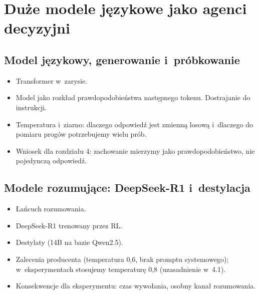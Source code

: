 
\chapter{Duże modele językowe jako agenci decyzyjni}
\label{ch:llm-agenci}


\section{Model językowy, generowanie i~próbkowanie}
\label{sec:2-1}

\begin{planroboczy}[ok. 2 s.]
\begin{itemize}
  \item Transformer w~zarysie.
  \item Model jako rozkład prawdopodobieństwa następnego tokenu. Dostrajanie do instrukcji.
  \item Temperatura i~ziarno: dlaczego odpowiedź jest zmienną losową i~dlaczego do pomiaru progów potrzebujemy wielu prób.
  \item Wniosek dla rozdziału 4: zachowanie mierzymy jako prawdopodobieństwo, nie pojedynczą odpowiedź.
\end{itemize}

\end{planroboczy}

\section{Modele rozumujące: DeepSeek-R1 i~destylacja}
\label{sec:2-2}

\begin{planroboczy}[ok. 1,5 s.]
\begin{itemize}
  \item Łańcuch rozumowania.
  \item DeepSeek-R1 trenowany przez RL.
  \item Destylaty (14B na bazie Qwen2.5).
  \item Zalecenia producenta (temperatura 0,6, brak promptu systemowego); w~eksperymentach stosujemy temperaturę 0,8 (uzasadnienie w~4.1).
  \item Konsekwencje dla eksperymentu: czas wywołania, osobny kanał rozumowania.
\end{itemize}

\end{planroboczy}


